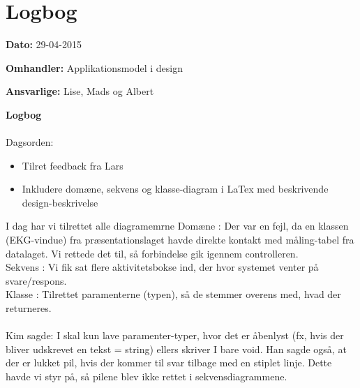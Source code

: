 \chapter{Logbog}

\textbf{Dato:} 29-04-2015

\textbf{Omhandler:} Applikationsmodel i design

\textbf{Ansvarlige:} Lise, Mads og Albert

\textbf{Logbog}
\\
\\
Dagsorden:
\begin{itemize}
	\item Tilret feedback fra Lars
	\item Inkludere domæne, sekvens og klasse-diagram i LaTex med beskrivende design-beskrivelse
\end{itemize}

I dag har vi tilrettet alle diagramemrne
Domæne :  Der var en fejl, da en klassen (EKG-vindue) fra præsentationslaget havde direkte kontakt med måling-tabel fra datalaget. Vi rettede det til, så forbindelse gik igennem controlleren. 
\\
Sekvens : Vi fik sat flere aktivitetsbokse ind, der hvor systemet venter på svare/respons. 
\\
Klasse : Tilrettet paramenterne (typen), så de stemmer overens med, hvad der returneres. 
\\
\\
Kim sagde: I skal kun lave paramenter-typer, hvor det er åbenlyst (fx, hvis der bliver udskrevet en tekst = string) ellers skriver I bare void. 
Han sagde også, at der er lukket pil, hvis der kommer til svar tilbage med en stiplet linje. Dette havde vi styr på, så pilene blev ikke rettet i sekvensdiagrammene.   